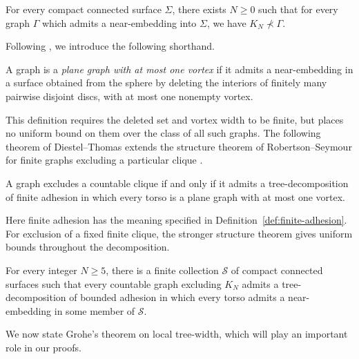 \documentclass[a4paper]{amsart}
\begin{document}
\begin{proposition}\label{prop:near-embeddings-exclude-minors}
    For every compact connected surface $\Sigma$, there exists $N \geq 0$ such that for every graph $\Gamma$ which admits a near-embedding into $\Sigma$, we have $K_N \not\prec \Gamma$.
\end{proposition}

Following \cite{diestel1999excluding}, we introduce the following shorthand. 

\begin{definition}\label{def:one-vortex}
A graph is a \emph{plane graph with at most one vortex} if it admits a near-embedding in a surface obtained from the sphere by deleting the interiors of finitely many pairwise disjoint discs, with at most one nonempty vortex.
\end{definition}

This definition requires the deleted set and vortex width to be finite, but places no uniform bound on them over the class of all such graphs.
The following theorem of Diestel--Thomas extends the structure theorem of Robertson--Seymour for finite graphs excluding a particular clique \cite{robertson2003graph}.



\begin{theorem}\label{thm:diestel-thomas}
A graph excludes a countable clique if and only if it admits a tree-decomposition of finite adhesion in which every torso is a plane graph with at most one vortex.
\end{theorem}

Here finite adhesion has the meaning specified in Definition~\ref{def:finite-adhesion}.
For exclusion of a fixed finite clique, the stronger structure theorem gives uniform bounds throughout the decomposition.

\begin{theorem}\label{thm:finite-clique-structure}
    For every integer $N \geq 5$, there is a finite collection $\mathcal S$ of compact connected surfaces such that every countable graph excluding $K_N$ admits a tree-decomposition of bounded adhesion in which every torso admits a near-embedding in some member of $\mathcal S$.
\end{theorem}

We now state Grohe's theorem on local tree-width, which will play an important role in our proofs.
\end{document}
